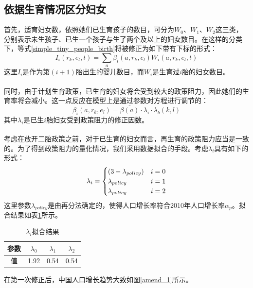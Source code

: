 \documentclass[a4paper]{article}
\begin{document}
\subsection{依据生育情况区分妇女}
首先，适育妇女数，依照她们已生育孩子的数目，可分为$W_0$、$W_1$、$W_2$这三类，分别表示未生孩子、已生一个孩子与生了两个及以上的妇女数目。在这样的分类下，等式\ref{simple_tiny_people_birth}将被修正为如下带有下标的形式：
	\begin{equation}
		\label{amend_tiny_people_birth}
		I_i(r_k, e_l, t) = \sum_a \beta_i(a, r_k, e_l)W_i(a, r_k, e_l, t)
	\end{equation}
这里$I_i$是作为第$(i+1)$胎出生的婴儿数目，而$W_i$是生育过$i$胎的妇女数目。\\\\
\indent
同时，由于计划生育政策，已生育的妇女将会受到较大的政策阻力，因此她们的生育率将会减小。这一点反应在模型上是通过参数对方程进行调节的：
	\begin{equation}
		\label{amend_birthrate}
		\beta_i(a, r_k, e_l) = \overline{\beta(a)} \cdot \lambda_i \cdot \lambda_b(k,l)
	\end{equation}
其中$\lambda_i$是已生$i$胎妇女受到政策阻力的修正因数。\\\\
\indent
考虑在放开二胎政策之前，对于已生育的妇女而言，再生育的政策阻力应当是一致的。为了得到政策阻力的量化情况，我们采用数据拟合的手段。考虑$\lambda_i$具有如下的形式：
	\begin{eqnarray} \lambda_i=
		\label{amend_lambda_i_form}
		\begin{cases}
		(3-\lambda_{policy})	&	i=0	\cr	\lambda_{policy}	&	i=1	\cr	\lambda_{policy}	&	i=2
		\end{cases}
	\end{eqnarray}
这里参数$\lambda_{policy}$是由再分法确定的，使得人口增长率符合2010年人口增长率$\alpha_p$。拟合结果如表\ref{amend_lambda_i_value}所示。
	\begin{table}[H]
		\centering
		\caption{$\lambda_i$拟合结果}
		\label{amend_lambda_i_value}
		\begin{tabular}{c|ccc}
			参数	&	$\lambda_0$	&	$\lambda_1$	&	$\lambda_2$	\\
			\hline
			值		&	 1.92	&	0.54	&	0.54	\\
		\end{tabular}
	\end{table}
\indent
在第一次修正后，中国人口增长趋势大致如图\ref{amend_1}所示。\\
\end{document}

